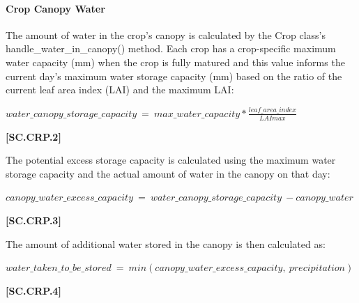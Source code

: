 \paragraph{Crop Canopy Water}
\vspace{-0.25cm}

The amount of water in the crop’s canopy is calculated by the Crop class’s handle\_water\_in\_canopy() method. Each crop has a crop-specific maximum water capacity (mm) when the crop is fully matured and this value informs the current day’s maximum water storage capacity (mm) based on the ratio of the current leaf area index (LAI) and the maximum LAI:  
\vspace{0.2cm}

    \begin{center}
        \(water\_canopy\_storage\_capacity\ =\ max\_water\_capacity * \frac{leaf\_area\_index}{LAImax}\)
    \end{center}
        \vspace{0.5cm}
    
            {\raggedleft \textbf{[SC.CRP.2]}\par}
            \vspace{0.5cm}

The potential excess storage capacity is calculated using the maximum water storage capacity and the actual amount of water in the canopy on that day:
\vspace{0.2cm}

    \begin{center}
        \(canopy\_water\_excess\_capacity\ =\ water\_canopy\_storage\_capacity\ - canopy\_water \)
    \end{center}
        \vspace{0.5cm}
    
            {\raggedleft \textbf{[SC.CRP.3]}\par}
            \vspace{0.5cm}

The amount of additional water stored in the canopy is then calculated as:
\vspace{0.2cm}

    \begin{center}
        \(water\_taken\_to\_be\_stored\ =\ min(canopy\_water\_excess\_capacity,\ precipitation) \)
    \end{center}
        \vspace{0.5cm}
    
            {\raggedleft \textbf{[SC.CRP.4]}\par}
            \vspace{0.5cm}

